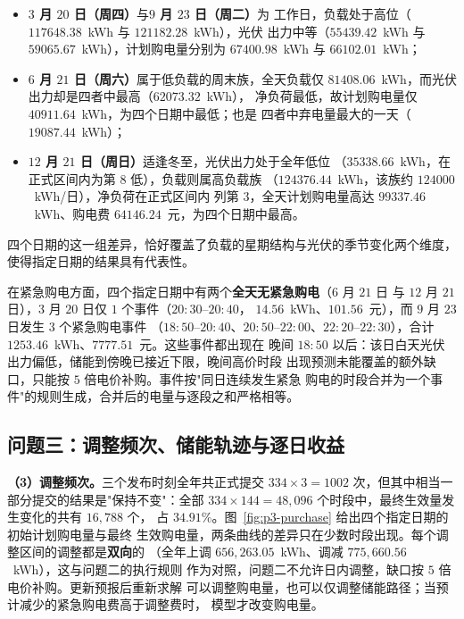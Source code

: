\begin{itemize}
  \item \textbf{$3$ 月 $20$ 日（周四）}与\textbf{$9$ 月 $23$ 日（周二）}为
        工作日，负载处于高位（$117648.38$~kWh 与 $121182.28$~kWh），光伏
        出力中等（$55439.42$~kWh 与 $59065.67$~kWh），计划购电量分别为
        $67400.98$~kWh 与 $66102.01$~kWh；
  \item \textbf{$6$ 月 $21$ 日（周六）}属于低负载的周末族，全天负载仅
        $81408.06$~kWh，而光伏出力却是四者中最高（$62073.32$~kWh），
        净负荷最低，故计划购电量仅 $40911.64$~kWh，为四个日期中最低；也是
        四者中弃电量最大的一天（$19087.44$~kWh）；
  \item \textbf{$12$ 月 $21$ 日（周日）}适逢冬至，光伏出力处于全年低位
        （$35338.66$~kWh，在正式区间内为第 $8$ 低），负载则属高负载族
        （$124376.44$~kWh，该族约 $124000$~kWh/日），净负荷在正式区间内
        列第 $3$，全天计划购电量高达 $99337.46$~kWh、购电费
        $64146.24$~元，为四个日期中最高。
\end{itemize}

四个日期的这一组差异，恰好覆盖了负载的星期结构与光伏的季节变化两个维度，
使得指定日期的结果具有代表性。

在紧急购电方面，四个指定日期中有两个\textbf{全天无紧急购电}（$6$ 月 $21$ 日
与 $12$ 月 $21$ 日），$3$ 月 $20$ 日仅 $1$ 个事件（$20{:}30$--$20{:}40$，
$14.56$~kWh、$101.56$~元），而 $9$ 月 $23$ 日发生 $3$ 个紧急购电事件
（$18{:}50$--$20{:}40$、$20{:}50$--$22{:}00$、$22{:}20$--$22{:}30$），合计
$1253.46$~kWh、$7777.51$~元。这些事件都出现在
晚间 $18{:}50$ 以后：该日白天光伏出力偏低，储能到傍晚已接近下限，晚间高价时段
出现预测未能覆盖的额外缺口，只能按 $5$ 倍电价补购。事件按"同日连续发生紧急
购电的时段合并为一个事件"的规则生成，合并后的电量与逐段之和严格相等。

\subsection{问题三：调整频次、储能轨迹与逐日收益}
\label{app:p3-analysis}

\textbf{（3）调整频次。}三个发布时刻全年共正式提交
$334\times3=1002$ 次，但其中相当一部分提交的结果是"保持不变"：全部
$334\times144=48{,}096$ 个时段中，最终生效量发生变化的共有 $16{,}788$ 个，
占 $34.91\%$。图~\ref{fig:p3-purchase} 给出四个指定日期的初始计划购电量与最终
生效购电量，两条曲线的差异只在少数时段出现。每个调整区间的调整都是\textbf{双向}的
（全年上调 $656{,}263.05$~kWh、调减 $775{,}660.56$~kWh），这与问题二的执行规则
作为对照，问题二不允许日内调整，缺口按 $5$ 倍电价补购。更新预报后重新求解
可以调整购电量，也可以仅调整储能路径；当预计减少的紧急购电费高于调整费时，
模型才改变购电量。

